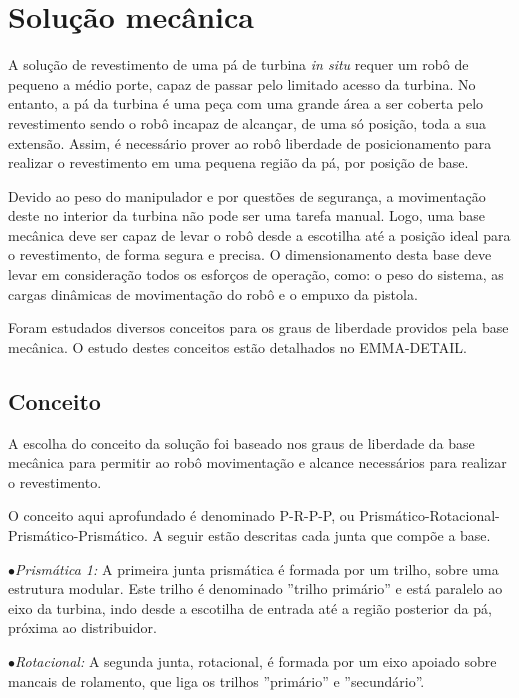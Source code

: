 \section{Solução mecânica}

A solução de revestimento de uma pá de turbina \textit{in situ} requer um robô
de pequeno a médio porte, capaz de passar pelo limitado acesso da turbina. 
No entanto, a pá da turbina é uma peça com uma grande área a ser coberta pelo
revestimento sendo o robô incapaz de alcançar, de uma só posição, toda a sua
extensão. Assim, é necessário prover ao robô liberdade de posicionamento
para realizar o revestimento em uma pequena região da pá, por posição de
base.

Devido ao peso do manipulador e por questões de segurança, a movimentação deste
no interior da turbina não pode ser uma tarefa manual. Logo, uma base mecânica
deve ser capaz de levar o robô desde a escotilha até a posição ideal
para o revestimento, de forma segura e precisa. O dimensionamento desta base deve levar
em consideração todos os esforços de operação, como: o peso do sistema, as
cargas dinâmicas de movimentação do robô e o empuxo da pistola. 

Foram estudados diversos conceitos para os graus de liberdade providos pela
base mecânica. O estudo destes conceitos estão detalhados no EMMA-DETAIL.

\subsection{Conceito}

A escolha do conceito da solução foi baseado nos graus de liberdade da base
mecânica para permitir ao robô movimentação e alcance necessários para realizar 
o revestimento. 

O conceito aqui aprofundado é denominado P-R-P-P, ou
Prismático-Rotacional-Prismático-Prismático.
A seguir estão descritas cada junta que compõe a base.

$\bullet$\textit{Prismática 1:} A primeira junta prismática é formada por um
trilho, sobre uma estrutura modular. Este trilho é denominado ''trilho primário'' e está
paralelo ao eixo da turbina, indo desde a escotilha de entrada até a região 
posterior da pá, próxima ao distribuidor.

$\bullet$\textit{Rotacional:} A segunda junta, rotacional, é formada por um
eixo apoiado sobre mancais de rolamento, que liga os trilhos ''primário'' e ''secundário''. 

